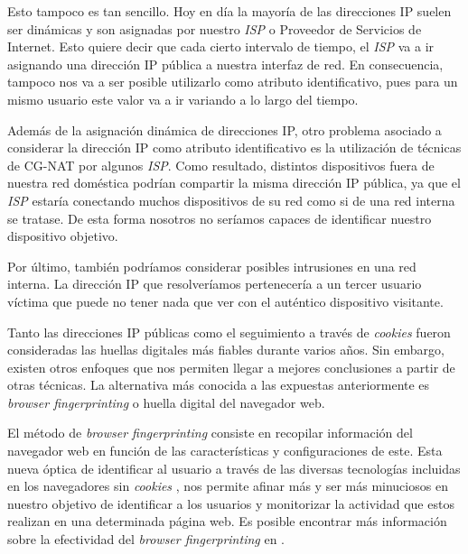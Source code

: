 Esto tampoco es tan sencillo. Hoy en día la mayoría de las direcciones IP suelen ser dinámicas y son asignadas por nuestro \textit{ISP} o Proveedor de Servicios de Internet. Esto quiere decir que cada cierto intervalo de tiempo, el \textit{ISP} va a ir asignando una dirección IP pública a nuestra interfaz de red. En consecuencia, tampoco nos va a ser posible utilizarlo como atributo identificativo, pues para un mismo usuario este valor va a ir variando a lo largo del tiempo. \par

Además de la asignación dinámica de direcciones IP, otro problema asociado a considerar la dirección IP como atributo identificativo es la utilización de técnicas de CG-NAT por algunos \textit{ISP}. Como resultado, distintos dispositivos fuera de nuestra red doméstica podrían compartir la misma dirección IP pública, ya que el \textit{ISP} estaría conectando muchos dispositivos de su red como si de una red interna se tratase. De esta forma nosotros no seríamos capaces de identificar nuestro dispositivo objetivo. \par

Por último, también podríamos considerar posibles intrusiones en una red interna. La dirección IP que resolveríamos pertenecería a un tercer usuario víctima que puede no tener nada que ver con el auténtico dispositivo visitante.  \par

Tanto las direcciones IP públicas como el seguimiento a través de \textit{cookies} fueron consideradas las huellas digitales más fiables durante varios años. Sin embargo, existen otros enfoques que nos permiten llegar a mejores conclusiones a partir de otras técnicas. La alternativa más conocida a las expuestas anteriormente es \textit{browser fingerprinting} o huella digital del navegador web. \par

El método de \textit{browser fingerprinting} \cite{fingerprint} consiste en recopilar información del navegador web en función de las características y configuraciones de este. Esta nueva óptica de identificar al usuario a través de las diversas tecnologías incluidas en los navegadores sin \textit{cookies} \cite{cookieless}, nos permite afinar más y ser más minuciosos en nuestro objetivo de identificar a los usuarios y monitorizar la actividad que estos realizan en una determinada página web. Es posible encontrar más información sobre la efectividad del \textit{browser fingerprinting} en \cite{panop_paper, javascript_paper, effective_paper}. \par 

